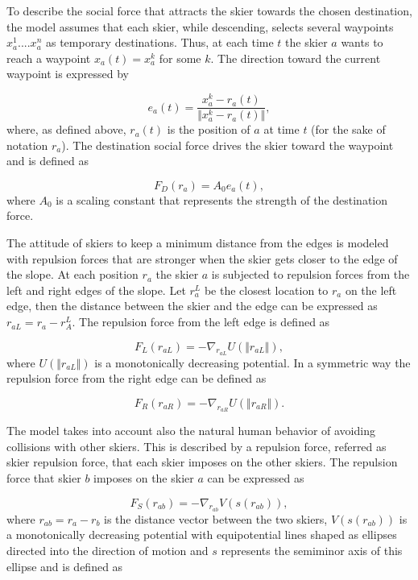 \documentclass[12pt,a4paper,twoside]{book}
\begin{document}
To describe the social force that attracts the skier towards the chosen destination, the model assumes that each skier, while descending, selects several waypoints $x_a^1....x_a^n$ as temporary destinations. Thus, at each time $t$ the skier $a$ wants to reach a waypoint $x_a(t)=x_a^k$ for some $k$. The direction toward the current waypoint is expressed by

\begin{equation}\label{waypoint_direction}
e_a(t)=\frac{x^k_a-r_a(t)}{\Vert x^k_a-r_a(t) \Vert},
\end{equation}
where, as defined above, $r_a(t)$ is the position of $a$ at time $t$ (for the sake of notation $r_a$). The destination social force drives the skier toward the waypoint and is defined as

\begin{equation}\label{destination_force}
F_D(r_a)=A_0 e_a(t),
\end{equation}
where $A_0$ is a scaling constant that represents the strength of the destination force.

The attitude of skiers to keep a minimum distance from the edges is modeled with repulsion forces that are stronger when the skier gets closer to the edge of the slope. At each position $r_a$ the skier $a$ is subjected to repulsion forces from the left and right edges of the slope. Let $r_a^L$ be the closest location to $r_a$ on the left edge, then the distance between the skier and the edge can be expressed as $r_{aL}=r_a-r_A^L$. The repulsion force from the left edge is defined as

\begin{equation}\label{left_force}
F_L(r_{aL})=-\nabla_{r_{aL}}U(\Vert r_{aL} \Vert ),
\end{equation}
where $U(\Vert r_{aL} \Vert )$ is a monotonically decreasing potential. In a symmetric way the repulsion force from the right edge can be defined as

\begin{equation}\label{right_force}
F_R(r_{aR})=-\nabla_{r_{aR}}U(\Vert r_{aR} \Vert ).
\end{equation}

The model takes into account also the natural human behavior of avoiding collisions with other skiers. This is described by a repulsion force, referred as skier repulsion force, that each skier imposes on the other skiers. The repulsion force that skier $b$ imposes on the skier $a$ can be expressed as

\begin{equation}\label{skier_force}
F_S(r_{ab})=-\nabla_{r_{ab}}V(s(r_{ab})),
\end{equation}
where $r_{ab}=r_a-r_b$ is the distance vector between the two skiers, $V(s(r_{ab}))$ is a monotonically decreasing potential with equipotential lines shaped as ellipses directed into the direction of motion and $s$ represents the semiminor axis of this ellipse and is defined as
\end{document}
